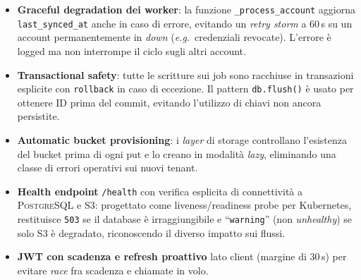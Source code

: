 \documentclass[11pt,a4paper,oneside]{article}
\begin{document}
\begin{itemize}[leftmargin=*]
        \texttt{INACTIVE\_INTERVAL = 24\,h} per gli inattivi), realizzando un
        \emph{adaptive throttling} che riduce inutile pressione su server
        IMAP e su LLM.
    \item \textbf{Graceful degradation dei worker}: la funzione
        \texttt{\_process\_account} aggiorna \texttt{last\_synced\_at} anche in
        caso di errore, evitando un \emph{retry storm} a 60\,s su un account
        permanentemente in \emph{down} (\emph{e.g.}\ credenziali revocate).
        L'errore \`e logged ma non interrompe il ciclo sugli altri account.
    \item \textbf{Transactional safety}: tutte le scritture sui job sono
        racchiuse in transazioni esplicite con \texttt{rollback} in caso di
        eccezione. Il pattern \texttt{db.flush()} \`e usato per ottenere ID
        prima del commit, evitando l'utilizzo di chiavi non ancora persistite.
    \item \textbf{Automatic bucket provisioning}: i \emph{layer} di storage
        controllano l'esistenza del bucket prima di ogni put e lo creano in
        modalit\`a \emph{lazy}, eliminando una classe di errori operativi sui
        nuovi tenant.
    \item \textbf{Health endpoint} \texttt{/health} con verifica esplicita di
        connettivit\`a a \textsc{PostgreSQL} e \textsc{S3}: progettato come
        liveness/readiness probe per Kubernetes, restituisce \texttt{503} se
        il database \`e irraggiungibile e ``\texttt{warning}'' (non
        \emph{unhealthy}) se solo S3 \`e degradato, riconoscendo il diverso
        impatto sui flussi.
    \item \textbf{JWT con scadenza e refresh proattivo} lato client (margine di
        $30$\,s) per evitare \emph{race} fra scadenza e chiamate in volo.
\end{itemize}
\end{document}
